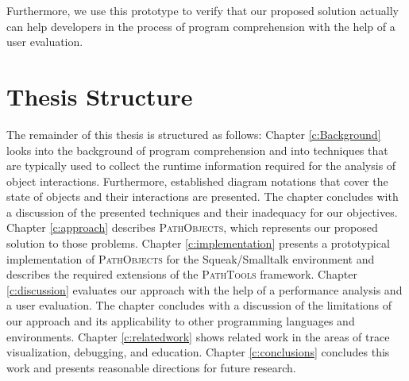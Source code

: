 Furthermore, we use this prototype to verify that our proposed solution actually can help developers in the process of program comprehension with the help of a user evaluation. 

\section{Thesis Structure}
The remainder of this thesis is structured as follows:
Chapter \ref{c:Background} looks into the background of program comprehension and into techniques that are typically used to collect the runtime information required for the analysis of object interactions.
Furthermore, established diagram notations that cover the state of objects and their interactions are presented.
The chapter concludes with a discussion of the presented techniques and their inadequacy for our objectives.
Chapter \ref{c:approach} describes \textsc{PathObjects}, which represents our proposed solution to those problems.
Chapter \ref{c:implementation} presents a prototypical implementation of \textsc{PathObjects} for the Squeak/Smalltalk environment and describes the required extensions of the \textsc{PathTools} framework.
Chapter \ref{c:discussion} evaluates our approach with the help of a performance analysis and a user evaluation. 
The chapter concludes with a discussion of the limitations of our approach and its applicability to other programming languages and environments.
Chapter \ref{c:relatedwork} shows related work in the areas of trace visualization, debugging, and education.
Chapter \ref{c:conclusions} concludes this work and presents reasonable directions for future research.